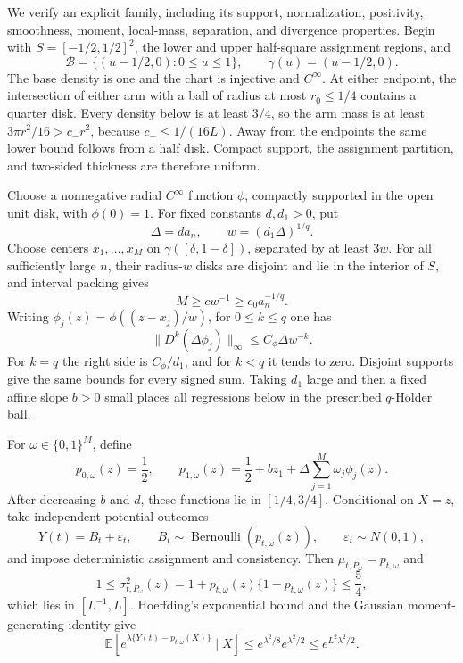We verify an explicit family, including its support, normalization, positivity, smoothness, moment, local-mass, separation, and divergence properties.  Begin with \(S=[-1/2,1/2]^2\), the lower and upper half-square assignment regions, and
\[
 \mathcal B=\{(u-1/2,0):0\leq u\leq1\},
 \qquad \gamma(u)=(u-1/2,0).
\]
The base density is one and the chart is injective and \(C^\infty\).  At either endpoint, the intersection of either arm with a ball of radius at most \(r_0\leq1/4\) contains a quarter disk.  Every density below is at least \(3/4\), so the arm mass is at least \(3\pi r^2/16>c_-r^2\), because \(c_-\leq1/(16L)\).  Away from the endpoints the same lower bound follows from a half disk.  Compact support, the assignment partition, and two-sided thickness are therefore uniform.

Choose a nonnegative radial \(C^\infty\) function \(\phi\), compactly supported in the open unit disk, with \(\phi(0)=1\).  For fixed constants \(d,d_1>0\), put
\[
 \Delta=d a_n,
 \qquad w=(d_1\Delta)^{1/q}.
\]
Choose centers \(x_1,\ldots,x_M\) on \(\gamma([\delta,1-\delta])\), separated by at least \(3w\).  For all sufficiently large \(n\), their radius-\(w\) disks are disjoint and lie in the interior of \(S\), and interval packing gives
\[
 M\geq c w^{-1}\geq c_0a_n^{-1/q}.
\]
Writing \(\phi_j(z)=\phi((z-x_j)/w)\), for \(0\leq k\leq q\) one has
\[
 \lVert D^k(\Delta\phi_j)\rVert_\infty
 \leq C_\phi\Delta w^{-k}.
\]
For \(k=q\) the right side is \(C_\phi/d_1\), and for \(k<q\) it tends to zero.  Disjoint supports give the same bounds for every signed sum.  Taking \(d_1\) large and then a fixed affine slope \(b>0\) small places all regressions below in the prescribed \(q\)-H\"older ball.

For \(\omega\in\{0,1\}^M\), define
\[
 p_{0,\omega}(z)=\frac12,
 \qquad
 p_{1,\omega}(z)=\frac12+bz_1+\Delta\sum_{j=1}^M\omega_j\phi_j(z).
\]
After decreasing \(b\) and \(d\), these functions lie in \([1/4,3/4]\).  Conditional on \(X=z\), take independent potential outcomes
\[
 Y(t)=B_t+\varepsilon_t,
 \qquad B_t\sim\operatorname{Bernoulli}(p_{t,\omega}(z)),
 \qquad \varepsilon_t\sim N(0,1),
\]
and impose deterministic assignment and consistency.  Then \(\mu_{t,P_\omega}=p_{t,\omega}\) and
\[
 1\leq\sigma^2_{t,P_\omega}(z)
 =1+p_{t,\omega}(z)\{1-p_{t,\omega}(z)\}
 \leq\frac54,
\]
which lies in \([L^{-1},L]\).  Hoeffding's exponential bound and the Gaussian moment-generating identity give
\[
 \mathbb E\!\left[e^{\lambda\{Y(t)-p_{t,\omega}(X)\}}\mid X\right]
 \leq e^{\lambda^2/8}e^{\lambda^2/2}
 \leq e^{L^2\lambda^2/2}.
\]

